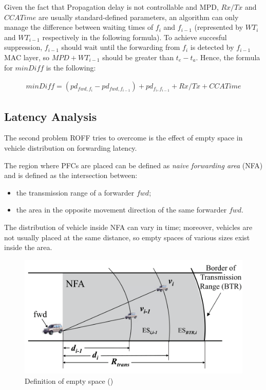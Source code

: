 			
			Given the fact that Propagation delay is not controllable and MPD, $Rx/Tx$ and $CCATime$ are usually standard-defined parameters, an algorithm can only manage the difference between waiting times of $f_i$ and $f_{i-1}$ (represented by $WT_i$ and $WT_{i-1}$ respectively in the following formula).
			To achieve succesful suppression, $f_{i-1}$ should wait until the forwarding from $f_i$ is detected by $f_{i-1}$ MAC layer, so $MPD+WT_{i-1}$ should be greater than $t_e - t_a$. Hence, the formula for $minDiff$ is the following:
			
			\begin{gather}
				\label{eq:minDiff}
				minDiff = (pd_{fwd, f_i} - pd_{fwd, f_{i-1}}) + pd_{f_i, f_{i-1}} + Rx/Tx + CCATime 
			\end{gather}
		
		\subsection{Latency Analysis}
			\label{ssec:latency-analysis}
			The second problem ROFF tries to overcome is the effect of empty space in vehicle distribution on forwarding latency.
			
			The region where PFCs are placed can be defined as \textit{naive forwarding area} (NFA) and is defined as the intersection between:
			\begin{itemize}
				\item the transmission range of a forwarder $fwd$;
				\item the area in the opposite movement direction of the same forwarder $fwd$.
			\end{itemize}
			The distribution of vehicle inside NFA can vary in time; moreover, vehicles are not usually placed at the same distance, so empty spaces of various sizes exist inside the area.
			
			\begin{figure}[H]
				\centering
				\includegraphics[width=\textwidth]{immagini/emptySpace}
				\caption{Definition of empty space (\cite{6906275})}
				\label{fig:emptySpace}
			\end{figure}
			
